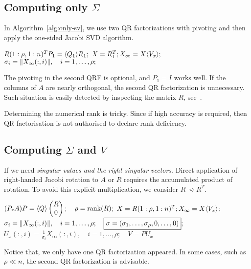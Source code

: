 \documentclass{article}
\begin{document}
\subsection{Computing only $\Sigma$}

In Algorithm~\ref{alg:only-sv}, we use two QR factorizations with pivoting
and then apply the one-sided Jacobi SVD algorithm.
\begin{algorithm}
\caption{$\sigma = \texttt{svd}(A)$}
\label{alg:only-sv}
  \begin{algorithmic}[1]
    \State $R(1:\rho,1:n)^TP_1 = \langle Q_1\rangle R_1;$
    \State $X = R_1^{T}; X_{\infty} = X\langle V_x\rangle;$
    \State $\sigma_i = \|{X_{\infty}(:,i)}\|, \quad i = 1,\dots,\rho;$
    \State {}
  \end{algorithmic}
\end{algorithm}

\begin{remark}
  The pivoting in the second QRF is optional, and $P_1 = I$ works well. If
  the columns of $A$ are nearly orthogonal, the second QR factorization is
  unnecessary. Such situation is easily detected by inspecting the matrix
  $R$, see~\cite{drve08ii}.
\end{remark}

\begin{remark}
  Determining the numerical rank is tricky. Since if high accuracy is
  required, then QR factorisation is not authorised to declare rank
  deficiency. 
\end{remark}

\subsection{Computing $\Sigma$ and $V$}
If we need \emph{singular values and the right singular vectors}. Direct
application of right-handed Jacobi rotation to $A$ or $R$ requires the
accumulated product of rotation. To avoid this explicit multiplication, we
consider $R \rightsquigarrow R^T$.

\begin{algorithm}
  \caption{$(\sigma, V) = \texttt{svd}(A)$}
  \begin{algorithmic}[1]
    \State $(P_rA)P = \langle Q\rangle \begin{pmatrix} R \\ 0 \end{pmatrix}; \quad
    \rho = \operatorname{rank}(R);$ 
    \State $X = R(1:\rho,1:n)^T; X_{\infty} = X\langle V_x\rangle$;
\State $\sigma_i = \|{X_{\infty}(:,i)}\|, \quad i = 1,\dots,\rho; \quad 
\boxed{\sigma = (\sigma_1,\dots,\sigma_\rho, 0,\dots, 0)};$
\State $U_x(:,i) = \frac{1}{\sigma_i}X_{\infty}(:,i),\quad i =
1,\dots,\rho;
\quad \boxed{V = PU_x}$
  \end{algorithmic}
\end{algorithm}
Notice that, we only have one QR factorization appeared. In some cases,
such as $\rho \ll n$, the second QR factorization is advisable.
\end{document}
